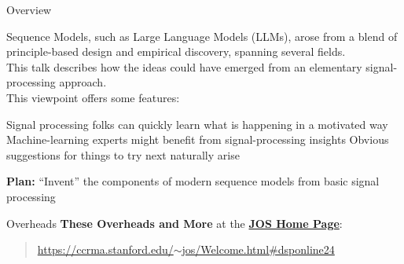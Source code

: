 \begin{slide}[\slideopts]{Overview}

Sequence Models, such as Large Language Models (LLMs), arose from a blend of principle-based design and empirical discovery, spanning several fields.\\
\maybepause
This talk describes how the ideas could have emerged from an elementary signal-processing approach.\\
\maybepause
This viewpoint offers some features:
\begin{enumerate}
\mpitem Signal processing folks can quickly learn what is happening in a motivated way
\mpitem Machine-learning experts might benefit from signal-processing insights
\mpitem Obvious suggestions for things to try next naturally arise
\end{enumerate}


\vspace{1em}
\maybepause
\textbf{Plan:}
``Invent'' the components of modern sequence models from basic signal processing
\end{slide}

\begin{slide}[\slideopts,method=direct,toc={}]{Overheads}
\textbf{These Overheads and More} at the \href{https://ccrma.stanford.edu/~jos/Welcome.html#dsponline24}{\textbf{JOS Home Page}}:
\begin{quote}
\href{https://ccrma.stanford.edu/~jos/Welcome.html#dsponline24}{https://ccrma.stanford.edu/$\sim$jos/Welcome.html\#dsponline24}
\end{quote}
\end{slide}

